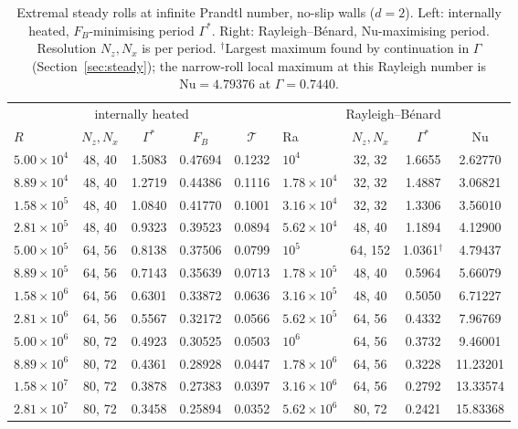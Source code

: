 \begin{table}[t]\centering\footnotesize
\caption{Extremal steady rolls at infinite Prandtl number, no-slip walls ($d=2$). Left: internally heated,
$F_B$-minimising period $\Gamma^*$. Right: Rayleigh--B\'enard, Nu-maximising period. Resolution $N_z,N_x$ is per
period. $^\dagger$Largest maximum found by continuation in $\Gamma$ (Section~\ref{sec:steady}); the narrow-roll
local maximum at this Rayleigh number is $\mathrm{Nu}=4.79376$ at $\Gamma=0.7440$.}\label{tab:steady}
\setlength{\tabcolsep}{3.5pt}
\begin{tabular}{lcccc|lccc}\hline
\multicolumn{5}{c|}{internally heated} & \multicolumn{4}{c}{Rayleigh--B\'enard}\\
$R$ & $N_z,N_x$ & $\Gamma^*$ & $F_B$ & $\mathcal T$ & Ra & $N_z,N_x$ & $\Gamma^*$ & Nu\\\hline
$5.00\times10^{4}$ & 48, 40 & 1.5083 & 0.47694 & 0.1232 & $10^{4}$ & 32, 32 & 1.6655 & 2.62770 \\
$8.89\times10^{4}$ & 48, 40 & 1.2719 & 0.44386 & 0.1116 & $1.78\times10^{4}$ & 32, 32 & 1.4887 & 3.06821 \\
$1.58\times10^{5}$ & 48, 40 & 1.0840 & 0.41770 & 0.1001 & $3.16\times10^{4}$ & 32, 32 & 1.3306 & 3.56010 \\
$2.81\times10^{5}$ & 48, 40 & 0.9323 & 0.39523 & 0.0894 & $5.62\times10^{4}$ & 48, 40 & 1.1894 & 4.12900 \\
$5.00\times10^{5}$ & 64, 56 & 0.8138 & 0.37506 & 0.0799 & $10^{5}$ & 64, 152 & 1.0361$^\dagger$ & 4.79437 \\
$8.89\times10^{5}$ & 64, 56 & 0.7143 & 0.35639 & 0.0713 & $1.78\times10^{5}$ & 48, 40 & 0.5964 & 5.66079 \\
$1.58\times10^{6}$ & 64, 56 & 0.6301 & 0.33872 & 0.0636 & $3.16\times10^{5}$ & 48, 40 & 0.5050 & 6.71227 \\
$2.81\times10^{6}$ & 64, 56 & 0.5567 & 0.32172 & 0.0566 & $5.62\times10^{5}$ & 64, 56 & 0.4332 & 7.96769 \\
$5.00\times10^{6}$ & 80, 72 & 0.4923 & 0.30525 & 0.0503 & $10^{6}$ & 64, 56 & 0.3732 & 9.46001 \\
$8.89\times10^{6}$ & 80, 72 & 0.4361 & 0.28928 & 0.0447 & $1.78\times10^{6}$ & 64, 56 & 0.3228 & 11.23201 \\
$1.58\times10^{7}$ & 80, 72 & 0.3878 & 0.27383 & 0.0397 & $3.16\times10^{6}$ & 64, 56 & 0.2792 & 13.33574 \\
$2.81\times10^{7}$ & 80, 72 & 0.3458 & 0.25894 & 0.0352 & $5.62\times10^{6}$ & 80, 72 & 0.2421 & 15.83368 \\

\end{tabular}
\end{table}
